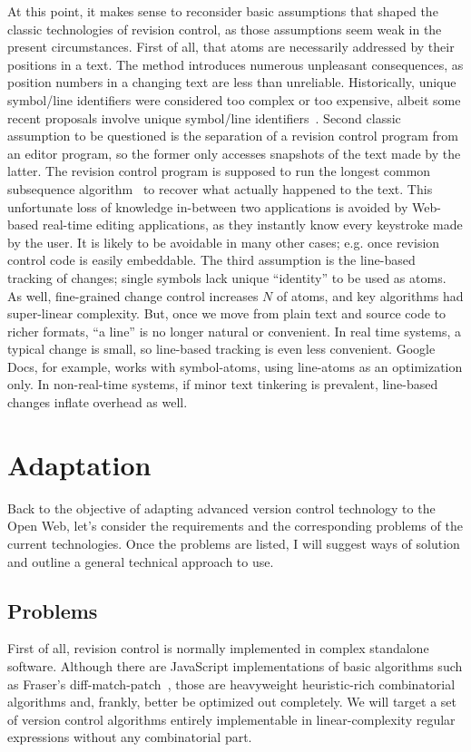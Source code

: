 \documentclass{sig-alternate}
\begin{document}
At this point, it makes sense to reconsider basic assumptions that shaped the classic technologies of revision control, as those assumptions seem weak in the present circumstances. 
First of all, that atoms are necessarily addressed by their positions in a text.
The method introduces numerous unpleasant consequences, as position numbers in a changing text are less than unreliable. 
Historically, unique symbol/line identifiers were considered too complex or too expensive, albeit some recent proposals involve unique symbol/line identifiers~\cite{woot,logoot}.
Second classic assumption to be questioned is the separation of a revision control program from an editor program, so the former only accesses snapshots of the text made by the latter.
The revision control program is supposed to run the longest common subsequence algorithm~\cite{lcs-algo} to recover what actually happened to the text.
This unfortunate loss of knowledge in-between two applications is avoided by Web-based real-time editing applications, as they instantly know every keystroke made by the user.
It is likely to be avoidable in many other cases; e.g. once revision control code is easily embeddable.
The third assumption is the line-based tracking of changes; single symbols lack unique ``identity'' to be used as atoms.
As well, fine-grained change control increases $N$ of atoms, and key algorithms had super-linear complexity.
But, once we move from plain text and source code to richer formats, ``a line'' is no longer natural or convenient.
In real time systems, a typical change is small, so line-based tracking is even less convenient.
Google Docs, for example, works with symbol-atoms, using line-atoms as an optimization only.
In non-real-time systems, if minor text tinkering is prevalent, line-based changes inflate overhead as well.


\section {Adaptation}   \label{sec:textile}

Back to the objective of adapting advanced version control technology to the Open Web, let's consider the requirements and the corresponding problems of the current technologies. 
Once the problems are listed, I will suggest ways of solution and outline a general technical approach to use.

\subsection {Problems}
First of all, revision control is normally implemented
in complex standalone software. Although there are JavaScript
implementations of basic algorithms such as Fraser's
diff-match-patch~\cite{diff-match-patch}, those are
heavyweight heuristic-rich combinatorial
algorithms and, frankly, better be optimized out
completely. We will target a set of version control
algorithms entirely implementable in 
linear-complexity regular
expressions without any combinatorial part.
\end{document}
